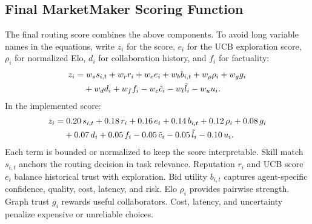 \subsection{Final MarketMaker Scoring Function}

The final routing score combines the above components. To avoid long variable names in the equations, write \(z_i\) for the \marketmaker{} score, \(e_i\) for the UCB exploration score, \(\rho_i\) for normalized Elo, \(d_i\) for collaboration history, and \(f_i\) for factuality:
\begin{align}
z_i =
&\; w_s s_{i,t}
+ w_r r_i
+ w_e e_i
+ w_b b_{i,t}
+ w_\rho \rho_i
+ w_g g_i \notag\\
&+ w_d d_i
+ w_f f_i
- w_c \tilde{c}_i
- w_l \tilde{l}_i
- w_u u_i.
\end{align}
In the implemented score:
\begin{align}
z_i =
&\; 0.20\,s_{i,t}
+0.18\,r_i
+0.16\,e_i
+0.14\,b_{i,t}
+0.12\,\rho_i
+0.08\,g_i \notag\\
&+0.07\,d_i
+0.05\,f_i
-0.05\,\tilde{c}_i
-0.05\,\tilde{l}_i
-0.10\,u_i.
\end{align}
Each term is bounded or normalized to keep the score interpretable. Skill match \(s_{i,t}\) anchors the routing decision in task relevance. Reputation \(r_i\) and UCB score \(e_i\) balance historical trust with exploration. Bid utility \(b_{i,t}\) captures agent-specific confidence, quality, cost, latency, and risk. Elo \(\rho_i\) provides pairwise strength. Graph trust \(g_i\) rewards useful collaborators. Cost, latency, and uncertainty penalize expensive or unreliable choices.
